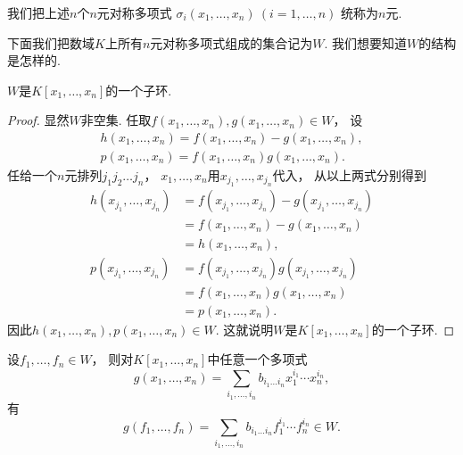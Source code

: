 我们把上述\(n\)个\(n\)元对称多项式
\(\sigma_i(x_1,\dotsc,x_n)\ (i=1,\dotsc,n)\)
统称为\(n\)元.

下面我们把数域\(K\)上所有\(n\)元对称多项式组成的集合记为\(W\).
我们想要知道\(W\)的结构是怎样的.

\begin{proposition}
\(W\)是\(K[x_1,\dotsc,x_n]\)的一个子环.
\begin{proof}
显然\(W\)非空集.
任取\(f(x_1,\dotsc,x_n),g(x_1,\dotsc,x_n) \in W\)，
设\begin{gather*}
	h(x_1,\dotsc,x_n)
	=f(x_1,\dotsc,x_n)
	-g(x_1,\dotsc,x_n), \\
	p(x_1,\dotsc,x_n)
	=f(x_1,\dotsc,x_n)
	g(x_1,\dotsc,x_n).
\end{gather*}
任给一个\(n\)元排列\(j_1 j_2 \dotso j_n\)，
\(x_1,\dotsc,x_n\)用\(x_{j_1},\dotsc,x_{j_n}\)代入，
从以上两式分别得到\begin{align*}
	h(x_{j_1},\dotsc,x_{j_n})
	&=f(x_{j_1},\dotsc,x_{j_n})
	-g(x_{j_1},\dotsc,x_{j_n}) \\
	&=f(x_1,\dotsc,x_n)
	-g(x_1,\dotsc,x_n) \\
	&=h(x_1,\dotsc,x_n), \\
	p(x_{j_1},\dotsc,x_{j_n})
	&=f(x_{j_1},\dotsc,x_{j_n})
	g(x_{j_1},\dotsc,x_{j_n}) \\
	&=f(x_1,\dotsc,x_n)
	g(x_1,\dotsc,x_n) \\
	&=p(x_1,\dotsc,x_n).
\end{align*}
因此\(h(x_1,\dotsc,x_n),p(x_1,\dotsc,x_n) \in W\).
这就说明\(W\)是\(K[x_1,\dotsc,x_n]\)的一个子环.
\end{proof}
\end{proposition}

\begin{proposition}
设\(f_1,\dotsc,f_n \in W\)，
则对\(K[x_1,\dotsc,x_n]\)中任意一个多项式\[
	g(x_1,\dotsc,x_n)
	=\sum_{i_1,\dotsc,i_n}
	b_{i_1 \dotso i_n}
	x_1^{i_1} \dotsm x_n^{i_n},
\]
有\[
	g(f_1,\dotsc,f_n)
	=\sum_{i_1,\dotsc,i_n}
	b_{i_1 \dotso i_n}
	f_1^{i_1} \dotsm f_n^{i_n}
	\in W.
\]
\end{proposition}

